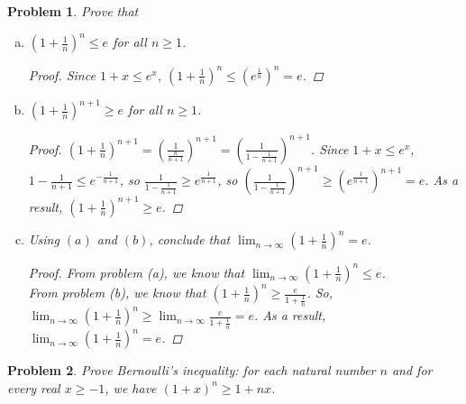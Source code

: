 \documentclass[12pt]{article}
\newtheorem{hw}{Problem}
\begin{document}
\begin{hw}
 Prove that

\begin{enumerate}[(a)]
  \item $\left(1+ \frac{1}{n}\right)^n\leq e$ for all $n\geq 1$.
  
  \begin{proof}
    Since $1+x\leqslant e^x$, $\left(1+ \frac{1}{n}\right)^n\leqslant (e^\frac{1}{n})^n=e $.
  \end{proof}

  \item $\left(1+\frac{1}{n}\right)^{n+1}\geq e$ for all $n\geq 1$.
  
  \begin{proof}
    $\left(1+\frac{1}{n}\right)^{n+1}=(\frac{1}{\frac{n}{n+1} } )^{n+1}=(\frac{1}{1-\frac{1}{n+1} } )^{n+1}$. Since $1+x\leqslant e^x$,$1-\frac{1}{n+1}\leqslant e^{-\frac{1}{n+1} }$, so $\frac{1}{1-\frac{1}{n+1} } \geqslant e^{\frac{1}{n+1} }$, so $(\frac{1}{1-\frac{1}{n+1} } )^{n+1}\geqslant (e^{\frac{1}{n+1} })^{n+1}=e$. 
    As a result, $\left(1+\frac{1}{n}\right)^{n+1}\geq e$.
  \end{proof}

  \item Using $(a)$ and $(b)$, conclude that $\lim_{n\rightarrow \infty}\left(1+\frac{1}{n}\right)^n =e$.
  
  \begin{proof}
    From problem (a), we know that $\lim_{n\rightarrow \infty}\left(1+\frac{1}{n}\right)^n \leqslant e$.\\
    From problem (b), we know that $\left(1+\frac{1}{n}\right)^{n}\geq \frac{e}{1+\frac{1}{n} } $. So, $\lim_{n\rightarrow \infty}\left(1+\frac{1}{n}\right)^n \geqslant \lim_{n\rightarrow \infty} \frac{e}{1+\frac{1}{n} }=e$. As a result, $\lim_{n\rightarrow \infty}\left(1+\frac{1}{n}\right)^n =e$.
  \end{proof}

\end{enumerate}
\end{hw}



\begin{hw}
Prove \emph{Bernoulli's inequality}: for each natural number $n$ and for every real $x\geq -1$, we have $(1+x)^n\geq 1+nx$.
\end{hw}
\end{document}
